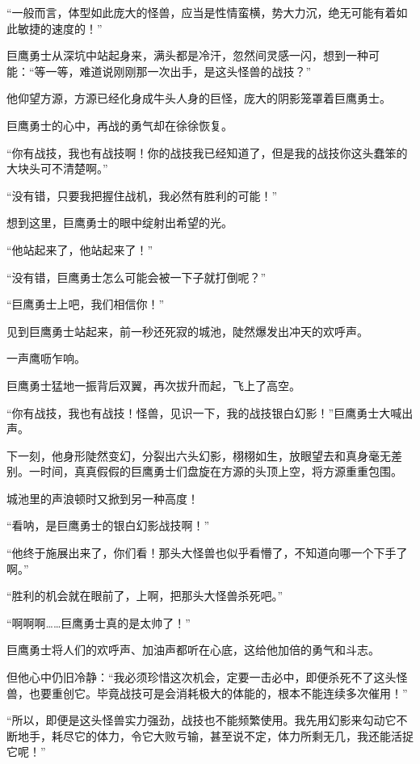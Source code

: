 
\begin{this_body}

“一般而言，体型如此庞大的怪兽，应当是性情蛮横，势大力沉，绝无可能有着如此敏捷的速度的！”

巨鹰勇士从深坑中站起身来，满头都是冷汗，忽然间灵感一闪，想到一种可能：“等一等，难道说刚刚那一次出手，是这头怪兽的战技？”

他仰望方源，方源已经化身成牛头人身的巨怪，庞大的阴影笼罩着巨鹰勇士。

巨鹰勇士的心中，再战的勇气却在徐徐恢复。

“你有战技，我也有战技啊！你的战技我已经知道了，但是我的战技你这头蠢笨的大块头可不清楚啊。”

“没有错，只要我把握住战机，我必然有胜利的可能！”

想到这里，巨鹰勇士的眼中绽射出希望的光。

“他站起来了，他站起来了！”

“没有错，巨鹰勇士怎么可能会被一下子就打倒呢？”

“巨鹰勇士上吧，我们相信你！”

见到巨鹰勇士站起来，前一秒还死寂的城池，陡然爆发出冲天的欢呼声。

一声鹰呖乍响。

巨鹰勇士猛地一振背后双翼，再次拔升而起，飞上了高空。

“你有战技，我也有战技！怪兽，见识一下，我的战技银白幻影！”巨鹰勇士大喊出声。

下一刻，他身形陡然变幻，分裂出六头幻影，栩栩如生，放眼望去和真身毫无差别。一时间，真真假假的巨鹰勇士们盘旋在方源的头顶上空，将方源重重包围。

城池里的声浪顿时又掀到另一种高度！

“看呐，是巨鹰勇士的银白幻影战技啊！”

“他终于施展出来了，你们看！那头大怪兽也似乎看懵了，不知道向哪一个下手了啊。”

“胜利的机会就在眼前了，上啊，把那头大怪兽杀死吧。”

“啊啊啊……巨鹰勇士真的是太帅了！”

巨鹰勇士将人们的欢呼声、加油声都听在心底，这给他加倍的勇气和斗志。

但他心中仍旧冷静：“我必须珍惜这次机会，定要一击必中，即便杀死不了这头怪兽，也要重创它。毕竟战技可是会消耗极大的体能的，根本不能连续多次催用！”

“所以，即便是这头怪兽实力强劲，战技也不能频繁使用。我先用幻影来勾动它不断地手，耗尽它的体力，令它大败亏输，甚至说不定，体力所剩无几，我还能活捉它呢！”


\end{this_body}
